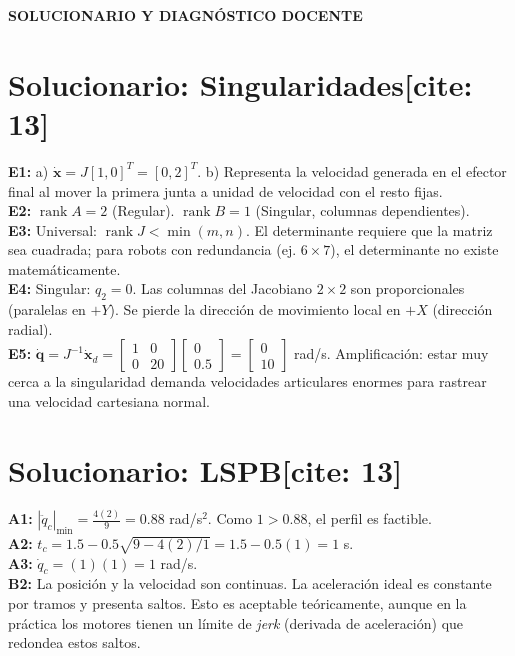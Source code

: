 \documentclass[11pt, a4paper]{article}
\begin{document}
\begin{center}
    \Large\textbf{\textcolor{red!80!black}{SOLUCIONARIO Y DIAGNÓSTICO DOCENTE}}\\[0.2cm]
\end{center}

\section*{Solucionario: Singularidades[cite: 13]}
\textbf{E1:} a) $\dot{\mathbf{x}} = J[1,0]^T = [0,2]^T$. b) Representa la velocidad generada en el efector final al mover la primera junta a unidad de velocidad con el resto fijas.\\
\textbf{E2:} $\operatorname{rank} A = 2$ (Regular). $\operatorname{rank} B = 1$ (Singular, columnas dependientes).\\
\textbf{E3:} Universal: $\operatorname{rank}J < \min(m,n)$. El determinante requiere que la matriz sea cuadrada; para robots con redundancia (ej. $6 \times 7$), el determinante no existe matemáticamente.\\
\textbf{E4:} Singular: $q_2=0$. Las columnas del Jacobiano $2 \times 2$ son proporcionales (paralelas en $+Y$). Se pierde la dirección de movimiento local en $+X$ (dirección radial).\\
\textbf{E5:} $\dot{\mathbf{q}} = J^{-1}\dot{\mathbf{x}}_d = \begin{bmatrix} 1 & 0 \\ 0 & 20 \end{bmatrix} \begin{bmatrix} 0 \\ 0.5 \end{bmatrix} = \begin{bmatrix} 0 \\ 10 \end{bmatrix}$ rad/s. Amplificación: estar muy cerca a la singularidad demanda velocidades articulares enormes para rastrear una velocidad cartesiana normal.

\section*{Solucionario: LSPB[cite: 13]}
\textbf{A1:} $|\ddot{q}_c|_{\min} = \frac{4(2)}{9} = 0.88$ rad/s$^2$. Como $1 > 0.88$, el perfil es factible.\\
\textbf{A2:} $t_c = 1.5 - 0.5\sqrt{9 - 4(2)/1} = 1.5 - 0.5(1) = 1$ s.\\
\textbf{A3:} $\dot{q}_c = (1)(1) = 1$ rad/s.\\
\textbf{B2:} La posición y la velocidad son continuas. La aceleración ideal es constante por tramos y presenta saltos. Esto es aceptable teóricamente, aunque en la práctica los motores tienen un límite de \textit{jerk} (derivada de aceleración) que redondea estos saltos.
\end{document}
